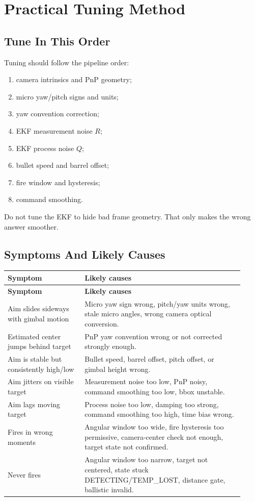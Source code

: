 \documentclass[11pt,a4paper]{article}
\begin{document}
\section{Practical Tuning Method}

\subsection{Tune In This Order}

Tuning should follow the pipeline order:
\begin{enumerate}[leftmargin=1.5em]
  \item camera intrinsics and PnP geometry;
  \item micro yaw/pitch signs and units;
  \item yaw convention correction;
  \item EKF measurement noise \(R\);
  \item EKF process noise \(Q\);
  \item bullet speed and barrel offset;
  \item fire window and hysteresis;
  \item command smoothing.
\end{enumerate}
Do not tune the EKF to hide bad frame geometry.
That only makes the wrong answer smoother.

\subsection{Symptoms And Likely Causes}

\begin{longtable}{p{0.30\linewidth} p{0.62\linewidth}}
\toprule
\textbf{Symptom} & \textbf{Likely causes} \\
\midrule
\endfirsthead
\toprule
\textbf{Symptom} & \textbf{Likely causes} \\
\midrule
\endhead
Aim slides sideways with gimbal motion & Micro yaw sign wrong, pitch/yaw units wrong, stale micro angles, wrong camera optical conversion. \\
Estimated center jumps behind target & PnP yaw convention wrong or not corrected strongly enough. \\
Aim is stable but consistently high/low & Bullet speed, barrel offset, pitch offset, or gimbal height wrong. \\
Aim jitters on visible target & Measurement noise too low, PnP noisy, command smoothing too low, bbox unstable. \\
Aim lags moving target & Process noise too low, damping too strong, command smoothing too high, time bias wrong. \\
Fires in wrong moments & Angular window too wide, fire hysteresis too permissive, camera-center check not enough, target state not confirmed. \\
Never fires & Angular window too narrow, target not centered, state stuck DETECTING/TEMP_LOST, distance gate, ballistic invalid. \\
\bottomrule
\end{longtable}
\end{document}
